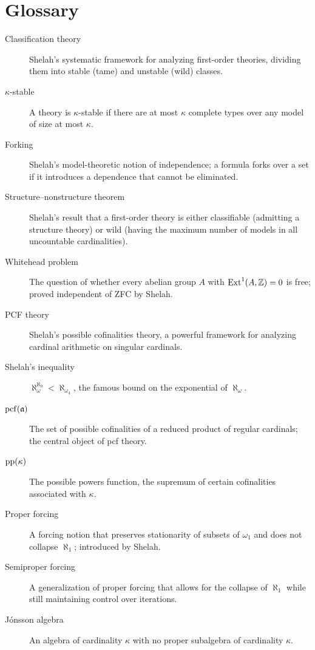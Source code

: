 \section*{Glossary}

\begin{description}
    \item[Classification theory] Shelah's systematic framework for analyzing first-order theories, dividing them into stable (tame) and unstable (wild) classes.
    \item[\(\kappa\)-stable] A theory is \(\kappa\)-stable if there are at most \(\kappa\) complete types over any model of size at most \(\kappa\).
    \item[Forking] Shelah's model-theoretic notion of independence; a formula forks over a set if it introduces a dependence that cannot be eliminated.
    \item[Structure--nonstructure theorem] Shelah's result that a first-order theory is either classifiable (admitting a structure theory) or wild (having the maximum number of models in all uncountable cardinalities).
    \item[Whitehead problem] The question of whether every abelian group \(A\) with \(\operatorname{Ext}^1(A,\mathbb{Z}) = 0\) is free; proved independent of ZFC by Shelah.
    \item[PCF theory] Shelah's possible cofinalities theory, a powerful framework for analyzing cardinal arithmetic on singular cardinals.
    \item[Shelah's inequality] \(\aleph_\omega^{\aleph_0} < \aleph_{\omega_4}\), the famous bound on the exponential of \(\aleph_\omega\).
    \item[\(\operatorname{pcf}(\mathfrak{a})\)] The set of possible cofinalities of a reduced product of regular cardinals; the central object of pcf theory.
    \item[\(\operatorname{pp}(\kappa)\)] The possible powers function, the supremum of certain cofinalities associated with \(\kappa\).
    \item[Proper forcing] A forcing notion that preserves stationarity of subsets of \(\omega_1\) and does not collapse \(\aleph_1\); introduced by Shelah.
    \item[Semiproper forcing] A generalization of proper forcing that allows for the collapse of \(\aleph_1\) while still maintaining control over iterations.
    \item[J\'onsson algebra] An algebra of cardinality \(\kappa\) with no proper subalgebra of cardinality \(\kappa\).

\end{description}
